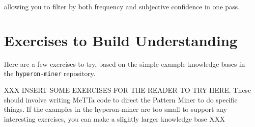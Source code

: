 allowing you to filter by both frequency and subjective confidence in one pass.

\section{Exercises to Build Understanding}

Here are a few exercises to try, based on the simple example knowledge bases in the \texttt{hyperon-miner}  repository.

XXX INSERT SOME EXERCISES FOR THE READER TO TRY HERE.   These should involve writing MeTTa code to direct the Pattern Miner to do specific things.   If the examples in the hyperon-miner are too small to support any interesting exercises, you can make a slightly larger knowledge base XXX
